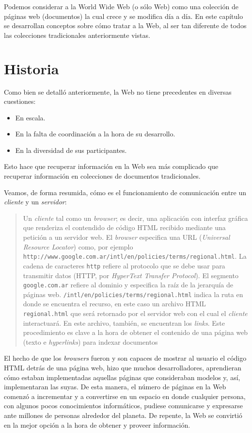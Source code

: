 Podemos considerar a la World Wide Web (o sólo Web) como una colección de páginas web (documentos) la cual crece y se modifica día a día. En este capítulo se desarrollan conceptos sobre cómo tratar a la Web, al ser tan diferente de todos las colecciones tradicionales anteriormente vistas.

\section{Historia}
	Como bien se detalló anteriormente, la Web no tiene precedentes en diversas cuestiones:
	\begin{itemize}
		\item En escala.
		\item En la falta de coordinación a la hora de su desarrollo.
		\item En la diversidad de sus participantes.
	\end{itemize}
	Esto hace que recuperar información en la Web sea más complicado que recuperar información en colecciones de documentos tradicionales. \par
	
	Veamos, de forma resumida, cómo es el funcionamiento de comunicación entre un \textit{cliente} y un \textit{servidor}:
	\begin{quotation}
		Un \textit{cliente} tal como un \textit{browser}; es decir, una aplicación con interfaz gráfica que renderiza el contendido de código HTML recibido mediante una petición a un servidor web. El \textit{browser} especifica una URL (\textit{Universal Resource Locator}) como, por ejemplo \texttt{http://www.google.com.ar/intl/en/policies/terms/regional.html}. La cadena de caracteres \texttt{http} refiere al protocolo que se debe usar para transmitir datos (HTTP, por \textit{HyperText Transfer Protocol}). El segmento \texttt{google.com.ar} refiere al dominio y especifica la raíz de la jerarquía de páginas web. \texttt{/intl/en/policies/terms/regional.html} indica la ruta en donde se encuentra el recurso, en este caso un archivo HTML \texttt{regional.html} que será retornado por el servidor web con el cual el \textit{cliente} interactuará. En este archivo, también, se encuentran los \textit{links}. Este procedimiento es clave a la hora de obtener el contenido de una página web (texto e \textit{hyperlinks}) para indexar documentos
	\end{quotation}
	
	El hecho de que los \textit{browsers} fueron y son capaces de mostrar al usuario el código HTML detrás de una página web, hizo que muchos desarrolladores, aprendieran cómo estaban implementadas aquellas páginas que consideraban modelos y, así, implementaran las suyas. De esta manera, el número de páginas en la Web comenzó a incrementar y a convertirse en un espacio en donde cualquier persona, con algunos pocos conocimientos informáticos, pudiese comunicarse y expresarse ante millones de personas alrededor del planeta. De repente, la Web se convirtió en la mejor opción a la hora de obtener y proveer información. \par
	
